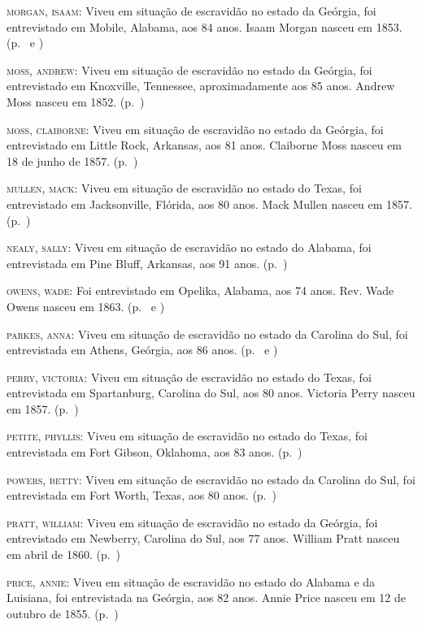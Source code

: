 \begin{Parskip}
\textsc{morgan, isaam:} Viveu em situação de escravidão no estado da Geórgia, foi entrevistado
em Mobile, Alabama, aos 84 anos. Isaam Morgan nasceu em 1853. (p.~\pageref{ref200} e \pageref{ref201})

\textsc{moss, andrew:} Viveu em situação de escravidão no estado da Geórgia, foi entrevistado em
Knoxville, Tennessee, aproximadamente aos 85 anos. Andrew Moss nasceu em
1852. (p.~\pageref{ref202})

\textsc{moss, claiborne:} Viveu em situação de escravidão no estado da Geórgia, foi entrevistado
em Little Rock, Arkansas, aos 81 anos. Claiborne Moss nasceu em 18 de
junho de 1857. (p.~\pageref{ref203})

\textsc{mullen, mack:} Viveu em situação de escravidão no estado do Texas, foi entrevistado em
Jacksonville, Flórida, aos 80 anos. Mack Mullen nasceu em 1857. (p.~\pageref{ref204})

\textsc{nealy, sally:} Viveu em situação de escravidão no estado do Alabama, foi entrevistada em
Pine Bluff, Arkansas, aos 91 anos. (p.~\pageref{ref205})

\textsc{owens, wade:} Foi entrevistado em Opelika, Alabama, aos 74 anos.
Rev. Wade Owens nasceu em 1863. (p.~\pageref{ref206} e \pageref{ref207})

\textsc{parkes, anna:} Viveu em situação de escravidão no estado da Carolina do Sul, foi
entrevistada em Athens, Geórgia, aos 86 anos. (p.~\pageref{ref208} e \pageref{ref209})

\textsc{perry, victoria:} Viveu em situação de escravidão no estado do Texas, foi entrevistada
em Spartanburg, Carolina do Sul, aos 80 anos. Victoria Perry nasceu em
1857. (p.~\pageref{ref210})

\textsc{petite, phyllis:} Viveu em situação de escravidão no estado do Texas, foi entrevistada
em Fort Gibson, Oklahoma, aos 83 anos. (p.~\pageref{ref211})

\textsc{powers, betty:} Viveu em situação de escravidão no estado da Carolina do Sul, foi
entrevistada em Fort Worth, Texas, aos 80 anos. (p.~\pageref{ref212})

\textsc{pratt, william:} Viveu em situação de escravidão no estado da Geórgia, foi entrevistado
em Newberry, Carolina do Sul, aos 77 anos. William Pratt nasceu em abril
de 1860. (p.~\pageref{ref213})

\textsc{price, annie:} Viveu em situação de escravidão no estado do Alabama e da Luisiana, foi
entrevistada na Geórgia, aos 82 anos. Annie Price nasceu em 12 de
outubro de 1855. (p.~\pageref{ref214})


\end{Parskip}
